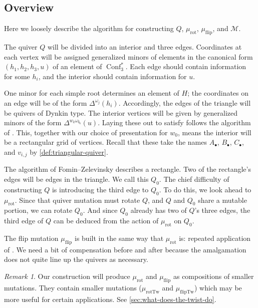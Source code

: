\documentclass{amsart}
\theoremstyle{plain}
\theoremstyle{definition}
\theoremstyle{remark}
\newtheorem{remark}[theorem]{Remark}
\newcommand{\conftoquiv}{\mathcal{M}}
\newcommand{\fundamentalweight}{\omega}
\newcommand{\genminor}[2]{\Delta^{{#1} \fundamentalweight_{#2}}}
\newcommand{\word}[1]{\mathbf{#1}}
\newcommand{\muflip}{{\mu_{\text{flip}}}}
\newcommand{\mufliptwist}{{\mu_{\text{flipTw}}}}
\newcommand{\murot}{{\mu_{\text{rot}}}}
\newcommand{\murottwist}{{\mu_{\text{rotTw}}}}
\DeclareMathOperator{\Conf}{Conf}
\begin{document}
  \subsection{Overview}

  Here we loosely describe the algorithm for constructing $Q$, $\murot$,
  $\muflip$, and $\conftoquiv$.

  The quiver $Q$ will be divided into an interior and three edges.
  Coordinates at each vertex will be assigned generalized minors of
  elements in the canonical form $(h_1, h_2, h_3, u)$ of an element of
  $\Conf_3^{\ast}$. Each edge should contain information for some $h_i$,
  and the interior should contain information for $u$.

  One minor for each simple root determines an element of $H$; the
  coordinates on an edge will be of the form $\genminor{}{j}(h_i)$.
  Accordingly, the edges of the triangle will be quivers of Dynkin type.
  The interior vertices will be given by generalized minors of the form
  $\genminor{w_k}{\word{i}_k}(u)$. Laying these out to satisfy
  \cite[Theorem~1.17]{fominzelevinsky1999} follows the algorithm of
  \cite[Section~2]{fominzelevinsky2005}. This, together with our choice
  of presentation for $w_0$, means the interior will be a rectangular
  grid of vertices. Recall that these take the names $A_{\bullet}$,
  $B_{\bullet}$, $C_{\bullet}$, and $v_{i,j}$ by
  \cref{def:triangular-quiver}.

  The algorithm of Fomin--Zelevinsky describes a rectangle. Two of the
  rectangle's edges will be edges in the triangle. We call this $Q_0$.
  The chief difficulty of constructing $Q$ is introducing the third edge
  to $Q_0$. To do this, we look ahead to $\murot$. Since that quiver
  mutation must rotate $Q$, and $Q$ and $Q_0$ share a mutable portion,
  we can rotate $Q_0$. And since $Q_0$ already has two of $Q$'s three
  edges, the third edge of $Q$ can be deduced from the action of
  $\murot$ on $Q_0$.

  The flip mutation $\muflip$ is built in the same way that $\murot$ is:
  repeated application of \cite[Theorem~1.17]{fominzelevinsky1999}. We
  need a bit of compensation before and after because the amalgamation
  does not quite line up the quivers as necessary.

  \begin{remark}
    Our construction will produce $\murot$ and $\muflip$ as compositions
    of smaller mutations. They contain smaller mutations ($\murottwist$
    and $\mufliptwist$) which may be more useful for certain
    applications. See \cref{sec:what-does-the-twist-do}.
  \end{remark}
\end{document}
